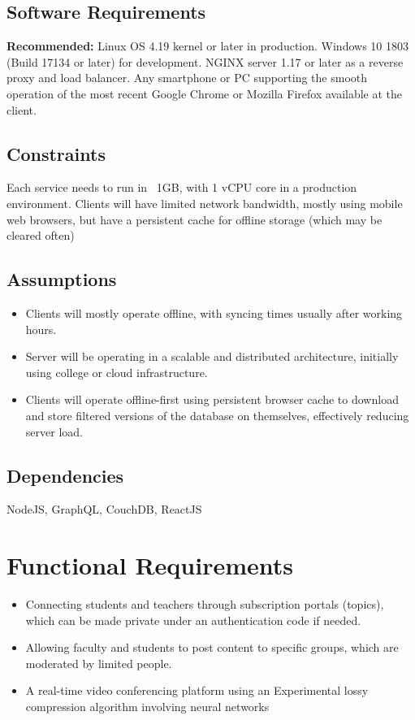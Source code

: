\subsection{Software Requirements}

\textbf{Recommended:} 
Linux OS 4.19 kernel or later in production.
Windows 10 1803 (Build 17134 or later) for development.
NGINX server 1.17 or later as a reverse proxy and load balancer.
Any smartphone or PC supporting the smooth operation of the most recent 
Google Chrome or Mozilla Firefox available at the client.

\subsection{Constraints}

Each service needs to run in ~1GB, with 1 vCPU core in a production environment.
Clients will have limited network bandwidth, mostly using mobile web browsers, but 
have a persistent cache for offline storage (which may be cleared often)

\subsection{Assumptions}

\begin{itemize}
    \item Clients will mostly operate offline, with syncing times usually after working hours.
    \item Server will be operating in a scalable and distributed architecture, 
    initially using college or cloud infrastructure.
    \item Clients will operate offline-first using persistent browser cache to download and store filtered versions of the database on themselves, effectively reducing server load.
\end{itemize}

\subsection{Dependencies}

NodeJS, GraphQL, CouchDB, ReactJS

\section{Functional Requirements}

\begin{itemize}
    \item Connecting students and teachers through subscription portals (topics), 
    which can be made private under an authentication code if needed.
    \item Allowing faculty and students to post content to specific groups, 
    which are moderated by limited people.
    \item A real-time video conferencing platform using an Experimental 
    lossy compression algorithm involving neural networks
\end{itemize}

